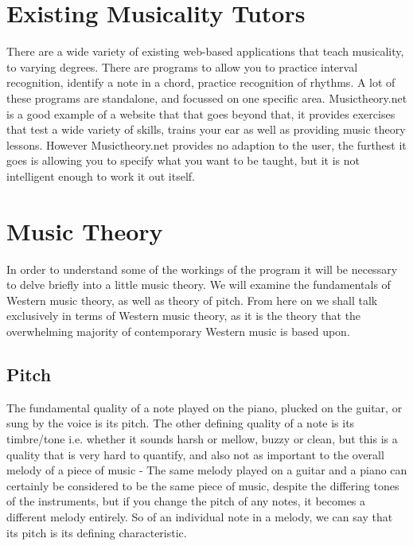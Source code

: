 	\section{Existing Musicality Tutors}
	
	There are a wide variety of existing web-based applications that teach musicality, to varying degrees. There are programs to allow you to practice interval recognition\cite{intervalEarTrainer}, identify a note in a chord, practice recognition of rhythms\cite{rhythmTrainer}. A lot of these programs are standalone, and focussed on one specific area. Musictheory.net\cite{musicTheorynet} is a good example of a website that that goes beyond that, it provides exercises that test a wide variety of skills, trains your ear as well as providing music theory lessons. However Musictheory.net provides no adaption to the user, the furthest it goes is allowing you to specify what you want to be taught, but it is not intelligent enough to work it out itself.
	\section{Music Theory}
	In order to understand some of the workings of the program it will be necessary to delve briefly into a little music theory. We will examine the fundamentals of Western music theory, as well as theory of pitch. From here on we shall talk exclusively in terms of Western music theory, as it is the theory that the overwhelming majority of contemporary Western music is based upon.
	

	\subsection{Pitch}
	\par The fundamental quality of a note played on the piano, plucked on the guitar, or sung by the voice is its pitch. The other defining quality of a note is its timbre/tone i.e. whether it sounds harsh or mellow, buzzy or clean, but this is a quality that is very hard to quantify, and also not as important to the overall melody of a piece of music - The same melody played on a guitar and a piano can certainly be considered to be the same piece of music, despite the differing tones of the instruments, but if you change the pitch of any notes, it becomes a different melody entirely. So of an individual note in a melody, we can say that its pitch is its defining characteristic.
	
